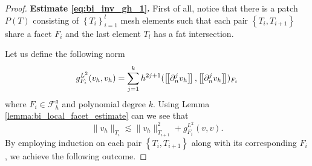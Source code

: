 \begin{proof}
        \textbf{Estimate \eqref{eq:bi_inv_gh_1}.}
            First of all, notice that there is a patch $P(T) $ consisting of $\left\{ T_{i} \right\}_{i=1}^{l} $ mesh elements such that each pair $ \left\{ T_{i}, T_{i+1} \right\} $ share a facet $F_{i}$ and the last element $T_{l}$ has a fat intersection.

            Let us define the following norm
            \begin{equation}
            g_{F_{i}}^{L^{2}}( v_{h},v_{h})  = \sum_{j=1}^{k} h^{2j+1}( \left[\!\left[  \partial ^{j}_{n}v_{h}  \right]\!\right], \left[\!\left[  \partial ^{j}_{n}v_{h}  \right]\!\right]    )_{F_{i} }
            \end{equation}
            where $F_{i} \in  \mathcal{F} ^{g}_{h}$ and polynomial degree $ k$. Using Lemma \ref{lemma:bi_local_facet_estimate} can we see that
            \begin{equation}
            \| v_{h} \|_{ T_{i} }^{  } \lesssim \| v_{h} \|_{ T_{i+1} }^{ 2 } + g_{F_{i}}^{L^{2}}( v,v).
            \end{equation}
By employing induction on each pair $\left\{ T_{i}, T_{i+1} \right\}$ along with its corresponding $F_{i}$, we achieve the following outcome.


\end{proof}
